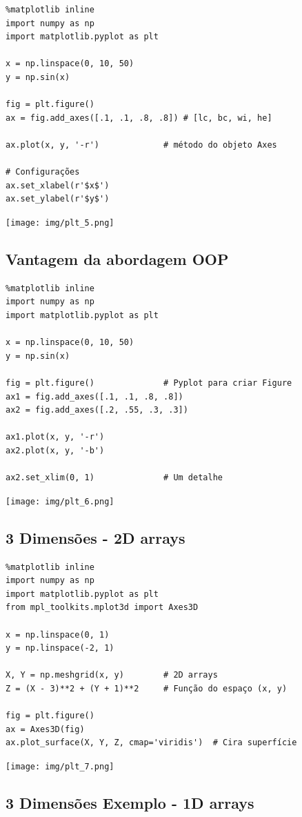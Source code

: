 \documentclass[presentation]{beamer}
\begin{document}
\begin{verbatim}
%matplotlib inline
import numpy as np
import matplotlib.pyplot as plt

x = np.linspace(0, 10, 50)
y = np.sin(x)

fig = plt.figure()
ax = fig.add_axes([.1, .1, .8, .8]) # [lc, bc, wi, he]

ax.plot(x, y, '-r')             # método do objeto Axes

# Configurações 
ax.set_xlabel(r'$x$')
ax.set_ylabel(r'$y$')
\end{verbatim}

\texttt{[image: img/plt\_5.png]}
\subsection{Vantagem da abordagem OOP}
\label{sec:orgheadline37}

\begin{verbatim}
%matplotlib inline
import numpy as np
import matplotlib.pyplot as plt

x = np.linspace(0, 10, 50)
y = np.sin(x)

fig = plt.figure()              # Pyplot para criar Figure
ax1 = fig.add_axes([.1, .1, .8, .8])
ax2 = fig.add_axes([.2, .55, .3, .3])

ax1.plot(x, y, '-r')
ax2.plot(x, y, '-b')

ax2.set_xlim(0, 1)              # Um detalhe
\end{verbatim}

\texttt{[image: img/plt\_6.png]}
\subsection{3 Dimensões - 2D arrays}
\label{sec:orgheadline38}

\begin{verbatim}
%matplotlib inline
import numpy as np
import matplotlib.pyplot as plt
from mpl_toolkits.mplot3d import Axes3D

x = np.linspace(0, 1)
y = np.linspace(-2, 1)

X, Y = np.meshgrid(x, y)        # 2D arrays
Z = (X - 3)**2 + (Y + 1)**2     # Função do espaço (x, y)

fig = plt.figure()
ax = Axes3D(fig)
ax.plot_surface(X, Y, Z, cmap='viridis')  # Cira superfície
\end{verbatim}

\texttt{[image: img/plt\_7.png]}


\subsection{3 Dimensões Exemplo - 1D arrays}
\label{sec:orgheadline39}
\end{document}
